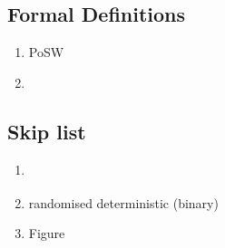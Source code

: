 \documentclass[a4paper,12pt]{article}
\begin{document}
  \subsection{Formal Definitions}
    \begin{enumerate}
      \item PoSW 
      \item 
    \end{enumerate}

  \subsection{Skip list}
    \begin{enumerate}
      \item \cite{Pug90}
      \item randomised \vs deterministic (binary)
      \item Figure
    \end{enumerate}
    
\end{document}
